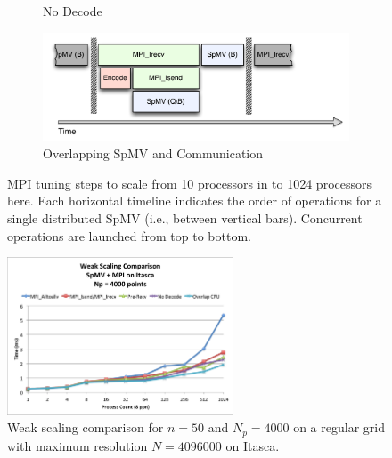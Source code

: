 \documentclass{report}
\begin{document}
\begin{figure}
\begin{subfigure}{0.6\textwidth}
\caption{No Decode}
\label{fig:no_decode_cpu}
\end{subfigure}
\begin{subfigure}{0.6\textwidth}
\centering
\includegraphics[width=\textwidth]{../figures/omnigraffle/OverlapCPU.pdf}
\caption{Overlapping SpMV and Communication}
\label{fig:overlap_cpu}
\end{subfigure}
\caption{MPI tuning steps to scale from 10 processors in \cite{BolligFlyerErlebacher2012} to 1024 processors here. Each horizontal timeline indicates the order of operations for a single distributed SpMV (i.e., between vertical bars). Concurrent operations are launched from top to bottom. } 
\label{fig:mpi_tuning}
\end{figure}

\begin{figure}
\centering
\includegraphics[width=0.6\textwidth]{performance_content/scaling/weak_scaling_np4000_compare_SpMV_and_comm_n50.png}
\caption{Weak scaling comparison for $n=50$ and $N_p = 4000$ on a regular grid with maximum resolution $N=4096000$ on Itasca.}
\label{fig:compare_weak_scaling_n50}
\end{figure}

%
\end{document}
